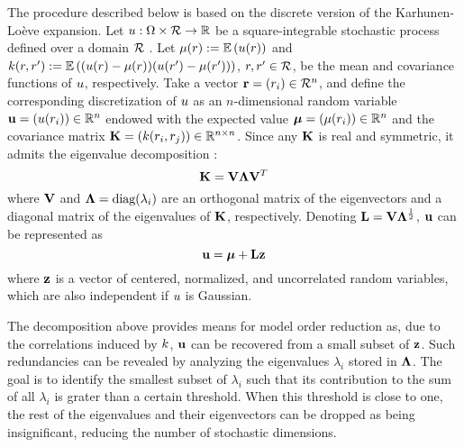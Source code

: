 The procedure described below is based on the discrete version of the Karhunen-Lo\`{e}ve expansion.
Let $u: \Omega \times \mathcal{R} \to \mathbb{R}$ be a square-integrable stochastic process defined over a domain $\mathcal{R}$ \cite{durrett2010}. Let $\fMean{\r} := \E{\u(\r)}$ and $\fCov{\r, \r'} := \E{(\u(\r) - \fMean{\r}) (\u(\r') - \fMean{\r'})}$, $r, r' \in \mathcal{R}$, be the mean and covariance functions of $u$, respectively.
Take a vector $\mathbf{r} = (r_i) \in \mathcal{R}^n$, and define the corresponding discretization of $u$ as an $n$-dimensional random variable $\mathbf{u} = (u(r_i)) \in \mathbb{R}^n$ endowed with the expected value $\vmean = (\fMean{\r_i}) \in \real^n$ and the covariance matrix $\mCov = (\fCov{\r_i, \r_j}) \in \real^{n \times n}$. Since any $\mathbf{K}$ is real and symmetric, it admits the eigenvalue decomposition \cite{press2007}:
\[
  \mathbf{K} = \mathbf{V} \mathbf{\Lambda} \mathbf{V}^T
\]
where $\mathbf{V}$ and $\mathbf{\Lambda} = \text{diag}(\lambda_i)$ are an orthogonal matrix of the eigenvectors and a diagonal matrix of the eigenvalues of $\mathbf{K}$, respectively. Denoting $\mathbf{L} = \mathbf{V} \mathbf{\Lambda}^\frac{1}{2}$, $\mathbf{u}$ can be represented as
\[
  \mathbf{u} = {\boldsymbol\mu} + \mathbf{L} \mathbf{z}
\]
where $\mathbf{z}$ is a vector of centered, normalized, and uncorrelated random variables, which are also independent if $u$ is Gaussian.

The decomposition above provides means for model order reduction as, due to the correlations induced by $\fCov$, $\mathbf{u}$ can be recovered from a small subset of $\mathbf{z}$. Such redundancies can be revealed by analyzing the eigenvalues $\lambda_i$ stored in $\mathbf{\Lambda}$.
The goal is to identify the smallest subset of $\lambda_i$ such that its contribution to the sum of all $\lambda_i$ is grater than a certain threshold.
When this threshold is close to one, the rest of the eigenvalues and their eigenvectors can be dropped as being insignificant, reducing the number of stochastic dimensions.
